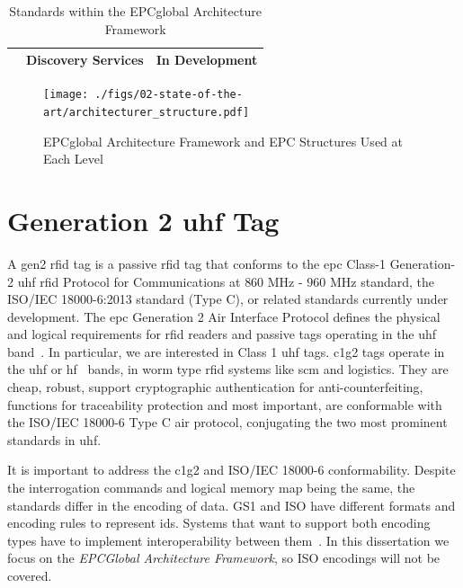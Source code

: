 \begin{table}[]
\begin{adjustwidth}{-0.09\textwidth}{0em}
\begin{tabular}{|l|l|l|}
                                                                                            & Discovery Services                                                                                                                                          & In Development                                                                                                                                                                                                                 \\ \hline
    \end{tabular}
    \end{adjustwidth}
    \caption{Standards within the EPCglobal Architecture Framework} 
    \label{tab:standards}
\end{table}

\begin{figure}[!ht]
    \centering
    \texttt{[image: ./figs/02-state-of-the-art/architecturer\_structure.pdf]}
    \caption{EPCglobal Architecture Framework and EPC Structures Used at Each Level~\cite{EPCTagData}} 
    \label{fig:archstructure}
\end{figure}

\section{Generation 2 \ac{uhf} Tag}

A \ac{gen2} \ac{rfid} tag is a passive \ac{rfid} tag that conforms to the \ac{epc} Class-1 Generation-2 \ac{uhf} \ac{rfid} Protocol for Communications at $860$ MHz - $960$ MHz standard, the ISO/IEC 18000-6:2013 standard (Type C), or related standards currently under development.
The \ac{epc} Generation 2 Air Interface Protocol defines the physical and logical requirements for \ac{rfid} readers and passive tags operating in the \ac{uhf} band~\cite{UHFGen2Tag}.
In particular, we are interested in Class 1 \ac{uhf} tags. \ac{c1g2} tags operate in the \ac{uhf} or \ac{hf}~\cite{HFClassTag} bands, in \ac{worm} type \ac{rfid} systems like \ac{scm} and logistics.
They are cheap, robust, support cryptographic authentication for anti-counterfeiting, functions for traceability protection and most important, are conformable with the ISO/IEC 18000-6 Type C air protocol, conjugating the two most prominent standards in \ac{uhf}.

It is important to address the \ac{c1g2} and ISO/IEC 18000-6 conformability. Despite the interrogation commands and logical memory map being the same, the standards differ in the encoding of data. 
GS1 and ISO have different formats and encoding rules to represent \acp{id}.
Systems that want to support both encoding types have to implement interoperability between them~\cite{mizutaniMulticodePortableRFID2016a}.
In this dissertation we focus on the \emph{EPCGlobal Architecture Framework}, so ISO encodings will not be covered.

